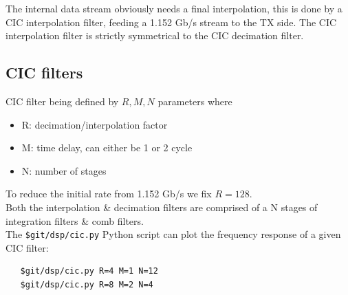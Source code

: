 \documentclass{article}
\begin{document}
The internal data stream obviously needs a final
interpolation, this is done by a CIC interpolation
filter, feeding a 1.152 Gb/s stream to the TX side.
The CIC interpolation filter is strictly symmetrical
to the CIC decimation filter.

\newpage
\subsection{CIC filters}

CIC filter being defined by $R, M, N$ parameters where

\begin{itemize}
	\item R: decimation/interpolation factor
	\item M: time delay, can either be 1 or 2 cycle
	\item N: number of stages
\end{itemize}

\vspace{0.2cm}
To reduce the initial rate from 1.152 Gb/s we fix
$R = 128$. \\

Both the interpolation \& decimation filters
are comprised of a N stages of integration filters
\& comb filters. \\

The {\tt \$git/dsp/cic.py} Python script 
can plot the frequency response
of a given CIC filter:

\begin{verbatim}
   $git/dsp/cic.py R=4 M=1 N=12
   $git/dsp/cic.py R=8 M=2 N=4
\end{verbatim}

\end{document}
